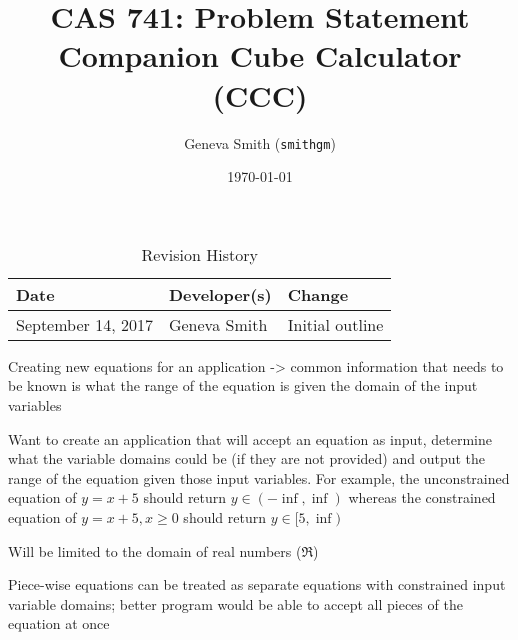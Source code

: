 \documentclass{article}
\title{CAS 741: Problem Statement\\Companion Cube Calculator (CCC)}
\author{Geneva Smith (\texttt{smithgm})}
\date{\today}
\begin{document}
\maketitle

\begin{table}[hp]
\caption{Revision History} \label{TblRevisionHistory}
\begin{tabularx}{\textwidth}{llX}
\toprule
\textbf{Date} & \textbf{Developer(s)} & \textbf{Change}\\
\midrule
September 14, 2017 & Geneva Smith & Initial outline \\
\bottomrule
\end{tabularx}
\end{table}

Creating new equations for an application -> common information that needs to be known is what the range of the equation is given the domain of the input variables

Want to create an application that will accept an equation as input, determine what the variable domains could be (if they are not provided) and output the range of the equation given those input variables. For example, the unconstrained equation of $y = x + 5$ should return $y \in (-\inf, \inf)$ whereas the constrained equation of $y = x + 5, x \geq 0$ should return $y \in [5, \inf)$

Will be limited to the domain of real numbers ($\Re$)

Piece-wise equations can be treated as separate equations with constrained input variable domains; better program would be able to accept all pieces of the equation at once
\end{document}
